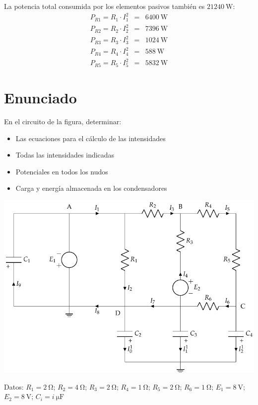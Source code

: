 La potencia total consumida por los elementos pasivos también es $\qty{21240}{\watt}$:
\begin{eqnarray*}
P_{R1} = R_1 \cdot I_1^2 & = & \qty{6400}{\watt}\\
P_{R2} = R_2 \cdot I_2^2 & = & \qty{7396}{\watt}\\
P_{R3} = R_3 \cdot I_3^2 & = & \qty{1024}{\watt}\\
P_{R4} = R_4 \cdot I_4^2 & = & \qty{588}{\watt}\\
P_{R5} = R_5 \cdot I_5^2 & = & \qty{5832}{\watt}
\end{eqnarray*}

\section{Enunciado}
En el circuito de la figura, determinar:
\begin{itemize}
\item Las ecuaciones para el cálculo de las intensidades
\item Todas las intensidades indicadas
\item Potenciales en todos los nudos
\item Carga y energía almacenada en los condensadores
\end{itemize}

\begin{center}
  \includegraphics{figuras/BT1_11.pdf}
\end{center}

  Datos: $R_1 = \qty{2}{\ohm}$; $R_2 = \qty{4}{\ohm}$; $R_3 = \qty{2}{\ohm}$; $R_4 = \qty{1}{\ohm}$; $R_5 = \qty{2}{\ohm}$; $R_6 = \qty{1}{\ohm}$; $E_1 = \qty{8}{\volt}$; $E_2 = \qty{8}{\volt}$; $C_i = \qty[parse-numbers=false]{i}{\micro\farad}$

